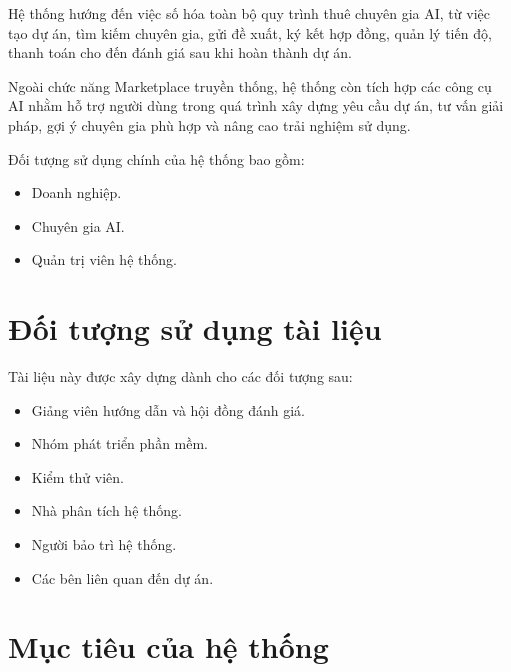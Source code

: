 Hệ thống hướng đến việc số hóa toàn bộ quy trình thuê chuyên gia AI, từ việc tạo
dự án, tìm kiếm chuyên gia, gửi đề xuất, ký kết hợp đồng, quản lý tiến độ, thanh
toán cho đến đánh giá sau khi hoàn thành dự án.

Ngoài chức năng Marketplace truyền thống, hệ thống còn tích hợp các công cụ AI
nhằm hỗ trợ người dùng trong quá trình xây dựng yêu cầu dự án, tư vấn giải pháp,
gợi ý chuyên gia phù hợp và nâng cao trải nghiệm sử dụng.

Đối tượng sử dụng chính của hệ thống bao gồm:

\begin{itemize}

\item Doanh nghiệp.

\item Chuyên gia AI.

\item Quản trị viên hệ thống.

\end{itemize}


\section{Đối tượng sử dụng tài liệu}

Tài liệu này được xây dựng dành cho các đối tượng sau:

\begin{itemize}

\item Giảng viên hướng dẫn và hội đồng đánh giá.

\item Nhóm phát triển phần mềm.

\item Kiểm thử viên.

\item Nhà phân tích hệ thống.

\item Người bảo trì hệ thống.

\item Các bên liên quan đến dự án.

\end{itemize}


\section{Mục tiêu của hệ thống}

